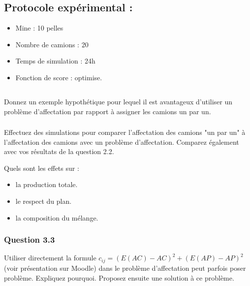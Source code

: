 \documentclass[letterpaper,12pt]{article}
\begin{document}
	
	\subsection*{Protocole expérimental : }
	
	\begin{itemize}
		\item Mine : 10 pelles
		\item Nombre de camions : 20
		\item Temps de simulation : 24h
		\item Fonction de score : optimise.
	\end{itemize}
	
	
	
	\subsection{}
	
	Donnez un exemple hypothétique pour lequel il est avantageux d'utiliser un problème d'affectation par rapport à assigner les camions un par un.
	
	\subsubsection{} 
	
	Effectuez des simulations pour comparer l'affectation des camions "un par un" à l'affectation des camions avec un problème d'affectation. Comparez également avec vos résultats de la question 2.2.
	
	Quels sont les effets sur :
	
	\begin{itemize}
		\item la production totale.
		\item le respect du plan.
		\item la composition du mélange.
	\end{itemize}
	
	\subsubsection*{Question 3.3}
	Utiliser directement la formule $c_{ij} = \left(E(AC)-AC\right)^2 + \left(E(AP)-AP\right)^2$ (voir présentation sur Moodle) dans le problème d'affectation peut parfois poser problème. Expliquez pourquoi. Proposez ensuite une solution à ce problème.
	
	
	
	
\end{document}
